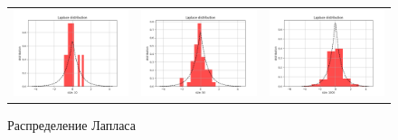 \documentclass[../main.tex]{subfiles}
\begin{document}
	\begin{figure}[H]
		\centering
		\begin{tabular}{ccc}
			\includegraphics[width=55mm, height =0.25\textheight]{figures/LaplaceNumber10.png} 
			&
			\includegraphics[width=55mm, height =0.25\textheight]{figures/LaplaceNumber50.png}
			&
			\includegraphics[width=55mm, height =0.25\textheight]{figures/LaplaceNumber1000.png}
		\end{tabular}
		\caption{Распределение Лапласа} 
		\label{fig:normal}
	\end{figure}
	
\end{document}
